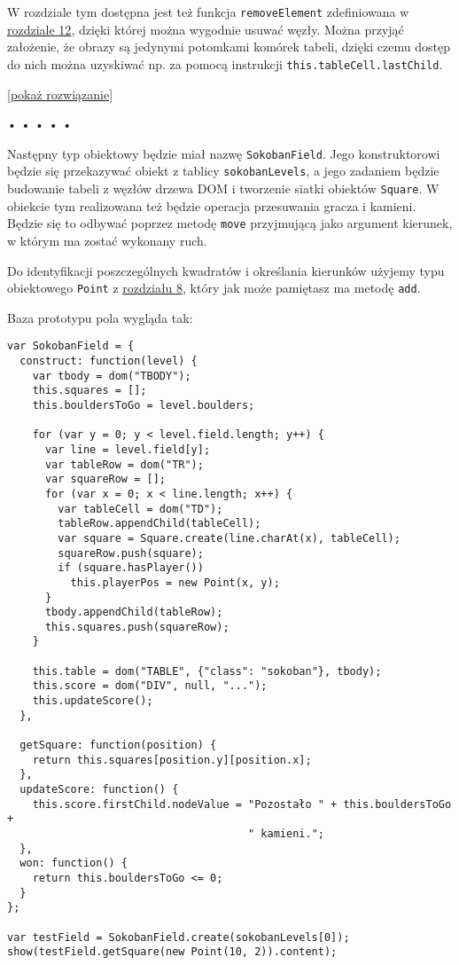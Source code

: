     
W rozdziale tym dostępna jest też funkcja \texttt{removeElement} zdefiniowana w \hyperref[chap:12]{rozdziale 12}, dzięki której można wygodnie usuwać węzły. Można przyjąć założenie, że obrazy są jedynymi potomkami komórek tabeli, dzięki czemu dostęp do nich można uzyskiwać np. za pomocą instrukcji \texttt{this.tableCell.lastChild}.

  
[\hyperref[sol:13.2]{pokaż rozwiązanie}]
  


\begin{center}
• • • • •
\end{center}

  
Następny typ obiektowy będzie miał nazwę \texttt{SokobanField}. Jego konstruktorowi będzie się przekazywać obiekt z tablicy \texttt{sokobanLevels}, a jego zadaniem będzie budowanie tabeli z węzłów drzewa DOM i tworzenie siatki obiektów \texttt{Square}. W obiekcie tym realizowana też będzie operacja przesuwania gracza i kamieni. Będzie się to odbywać poprzez metodę \texttt{move} przyjmującą jako argument kierunek, w którym ma zostać wykonany ruch.

  
Do identyfikacji poszczególnych kwadratów i określania kierunków użyjemy typu obiektowego \texttt{Point} z \hyperref[chap:8]{rozdziału 8}, który jak może pamiętasz ma metodę \texttt{add}.

  
Baza prototypu pola wygląda tak:

  
\begin{verbatim} 
var SokobanField = {
  construct: function(level) {
    var tbody = dom("TBODY");
    this.squares = [];
    this.bouldersToGo = level.boulders;

    for (var y = 0; y < level.field.length; y++) {
      var line = level.field[y];
      var tableRow = dom("TR");
      var squareRow = [];
      for (var x = 0; x < line.length; x++) {
        var tableCell = dom("TD");
        tableRow.appendChild(tableCell);
        var square = Square.create(line.charAt(x), tableCell);
        squareRow.push(square);
        if (square.hasPlayer())
          this.playerPos = new Point(x, y);
      }
      tbody.appendChild(tableRow);
      this.squares.push(squareRow);
    }

    this.table = dom("TABLE", {"class": "sokoban"}, tbody);
    this.score = dom("DIV", null, "...");
    this.updateScore();
  },

  getSquare: function(position) {
    return this.squares[position.y][position.x];
  },
  updateScore: function() {
    this.score.firstChild.nodeValue = "Pozostało " + this.bouldersToGo + 
                                      " kamieni.";
  },
  won: function() {
    return this.bouldersToGo <= 0;
  }
};

var testField = SokobanField.create(sokobanLevels[0]);
show(testField.getSquare(new Point(10, 2)).content);
 \end{verbatim}
  
